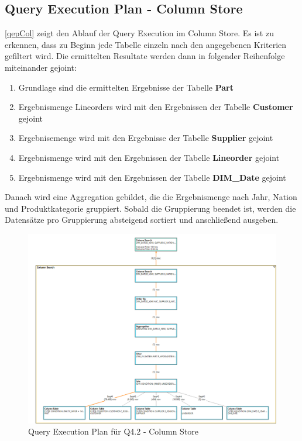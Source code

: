 \subsection{Query Execution Plan - Column Store}
\autoref{qepCol} zeigt den Ablauf der Query Execution im Column Store. Es ist zu erkennen, dass zu Beginn jede Tabelle einzeln nach den angegebenen Kriterien gefiltert wird. Die ermittelten Resultate werden dann in folgender Reihenfolge miteinander gejoint:
\begin{enumerate}
	\item Grundlage sind die ermittelten Ergebnisse der Tabelle \textbf{Part}
	\item Ergebnismenge Lineorders wird mit den Ergebnissen der Tabelle \textbf{Customer} gejoint
	\item Ergebnisemenge wird mit den Ergebnisse der Tabelle \textbf{Supplier} gejoint
	\item Ergebnismenge wird mit den Ergebnissen der Tabelle \textbf{Lineorder} gejoint
	\item Ergebnismenge wird mit den Ergebnissen der Tabelle \textbf{DIM\_Date} gejoint
\end{enumerate}
Danach wird eine Aggregation gebildet, die die Ergebnismenge nach Jahr, Nation und Produktkategorie gruppiert. Sobald die Gruppierung beendet ist, werden die Datensätze pro Gruppierung absteigend sortiert und anschließend ausgeben.
\begin{figure}[H]
	\centering
	\includegraphics[scale=0.35]{images/q42col}
	\caption{Query Execution Plan für Q4.2 - Column Store \label{qepCol} }
\end{figure}

